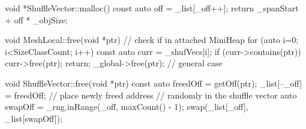 

void *ShuffleVector::malloc() {
  const auto off = _list[_off++];
  return _spanStart + off * _objSize;
}

void MeshLocal::free(void *ptr) {
  // check if in attached MiniHeap
  for (auto i=0; i<SizeClassCount; i++){
    const auto curr = _shufVecs[i];
    if (curr->contains(ptr)) {
      curr->free(ptr);
      return; } }
  _global->free(ptr); // general case
}

void ShuffleVector::free(void *ptr) {
  const auto freedOff = getOff(ptr);
  _list[--_off] = freedOff;
  // place newly freed address
  // randomly in the shuffle vector
  auto swapOff =
    _rng.inRange(_off, maxCount() - 1);
  swap(_list[_off], _list[swapOff]);
}

